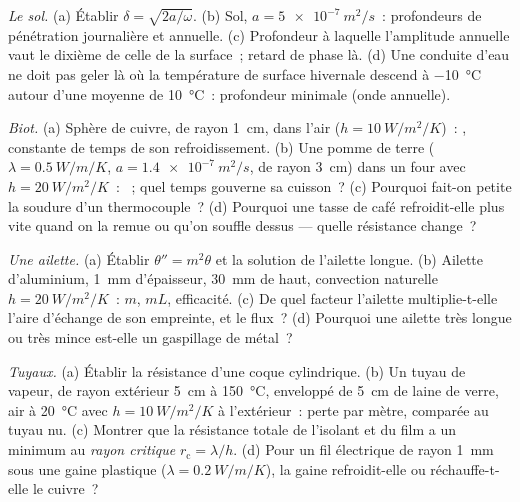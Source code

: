 \begin{exercise}[$\star\star$]\label{exo:b2:heat-conduction:6}
\emph{Le sol.} (a) Établir $\delta = \sqrt{2a/\omega}$. (b) Sol,
$a = \qty{5e-7}{m^2/s}$~: profondeurs de pénétration journalière et annuelle. (c) Profondeur
à laquelle l'amplitude annuelle vaut le dixième de celle de la surface~; retard de phase
là. (d) Une conduite d'eau ne doit pas geler là où la température de surface hivernale
descend à \qty{-10}{\celsius} autour d'une moyenne de
\qty{10}{\celsius}~: profondeur minimale (onde annuelle).
\end{exercise}

\begin{exercise}[$\star\star$]\label{exo:b2:heat-conduction:7}
\emph{Biot.} (a) Sphère de cuivre, de rayon \qty{1}{cm}, dans l'air ($h =
\qty{10}{W/m^2/K}$)~: , constante de temps de son refroidissement. (b) Une
pomme de terre ($\lambda = \qty{0.5}{W/m/K}$, $a = \qty{1.4e-7}{m^2/s}$, de rayon
\qty{3}{cm}) dans un four avec $h = \qty{20}{W/m^2/K}$~: ~; quel
temps gouverne sa cuisson~? (c) Pourquoi fait-on petite la soudure d'un thermocouple~?
(d) Pourquoi une tasse de café refroidit-elle plus vite quand on la remue ou qu'on souffle dessus ---
quelle résistance change~?
\end{exercise}

\begin{exercise}[$\star\star$]\label{exo:b2:heat-conduction:8}
\emph{Une ailette.} (a) Établir $\theta'' = m^2\theta$ et la solution de l'ailette longue.
(b) Ailette d'aluminium, \qty{1}{mm} d'épaisseur, \qty{30}{mm} de haut, convection
naturelle $h = \qty{20}{W/m^2/K}$~: $m$, $mL$, efficacité. (c) De quel
facteur l'ailette multiplie-t-elle l'aire d'échange de son empreinte, et le
flux~? (d) Pourquoi une ailette très longue ou très mince est-elle un gaspillage de métal~?
\end{exercise}

\begin{exercise}[$\star\star$]\label{exo:b2:heat-conduction:9}
\emph{Tuyaux.} (a) Établir la résistance d'une coque cylindrique. (b) Un
tuyau de vapeur, de rayon extérieur \qty{5}{cm} à \qty{150}{\celsius}, enveloppé de
\qty{5}{cm} de laine de verre, air à \qty{20}{\celsius} avec $h =
\qty{10}{W/m^2/K}$ à l'extérieur~: perte par mètre, comparée au tuyau nu.
(c) Montrer que la résistance totale de l'isolant et du film a un
minimum au \emph{rayon critique} $r_{\text{c}} = \lambda/h$. (d) Pour un
fil électrique de rayon \qty{1}{mm} sous une gaine plastique ($\lambda =
\qty{0.2}{W/m/K}$), la gaine refroidit-elle ou réchauffe-t-elle le cuivre~?
\end{exercise}

